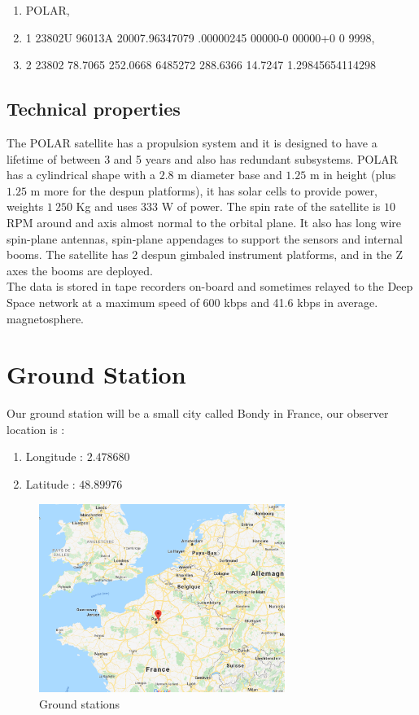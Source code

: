\documentclass[a4paper,12pt,calibri,oneside,openany]{book}
\theoremstyle{break}
\begin{document}
\begin{enumerate}
	\item POLAR,                  
	\item 1 23802U 96013A   20007.96347079  .00000245  00000-0  00000+0 0  9998,
	\item 2 23802  78.7065 252.0668 6485272 288.6366  14.7247  1.29845654114298
\end{enumerate}

\subsection{Technical properties}
The POLAR satellite has a propulsion system and it is designed to have a lifetime of between 3 and 5 years and also has redundant subsystems. POLAR has a cylindrical shape with a $2.8$ m diameter base and $1.25$ m in height (plus $1.25$ m more for the despun platforms), it has solar cells to provide power, weights $1\ 250$ Kg and uses $333$ W of power. The spin rate of the satellite is $10$ RPM around and axis almost normal to the orbital plane. It also has long wire spin-plane antennas, spin-plane appendages to support the sensors and internal booms. The satellite has 2 despun gimbaled instrument platforms, and in the Z axes the booms are deployed.\\

The data is stored in tape recorders on-board and sometimes relayed to the Deep Space network at a maximum speed of 600 kbps and 41.6 kbps in average.\\
 magnetosphere.

\section{Ground Station}
Our ground station will be a small city called Bondy in France, our observer location is :
\begin{enumerate}
	\item Longitude : $2.478680$
	\item Latitude : $48.89976$
\end{enumerate}
\begin{figure}[h]
	\centering
	\includegraphics[width=8cm]{bondy}
	\caption{Ground stations }
	\label{Ground Station}
\end{figure}
\end{document}
